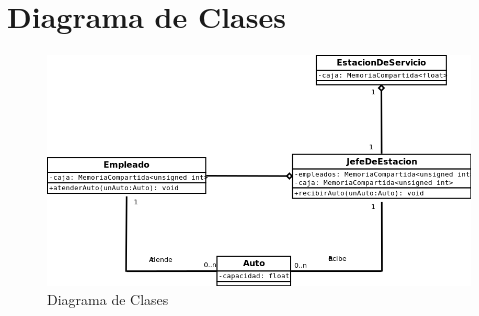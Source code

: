 \documentclass[12pt,a4paper,titlepage,oneside]{article}
\begin{document}
\section{Diagrama de Clases}
\begin{figure}[hbtp]
\centering
\includegraphics[scale=0.5]{diagramaDeClases.png}
\caption{Diagrama de Clases}
\end{figure}
\end{document}
